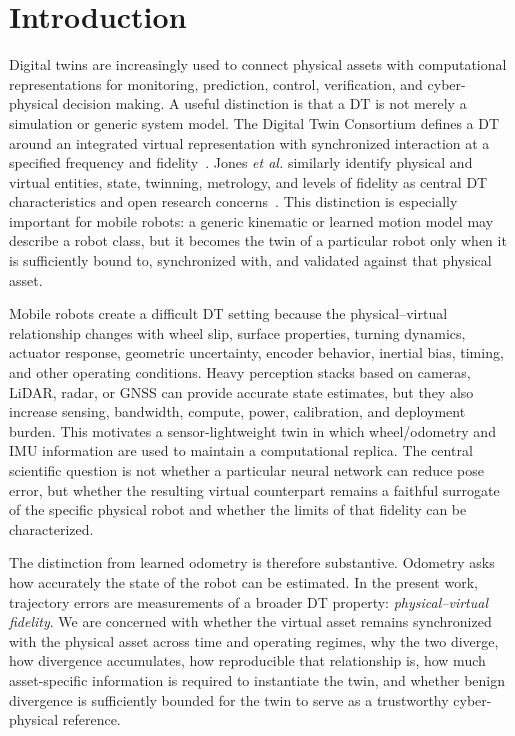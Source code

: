 \documentclass[conference]{IEEEtran}
\begin{document}
\section{Introduction}
Digital twins are increasingly used to connect physical assets with computational representations for monitoring, prediction, control, verification, and cyber-physical decision making. A useful distinction is that a DT is not merely a simulation or generic system model. The Digital Twin Consortium defines a DT around an integrated virtual representation with synchronized interaction at a specified frequency and fidelity~\cite{dtc_definition}. Jones \emph{et al.} similarly identify physical and virtual entities, state, twinning, metrology, and levels of fidelity as central DT characteristics and open research concerns~\cite{jones2020dt}. This distinction is especially important for mobile robots: a generic kinematic or learned motion model may describe a robot class, but it becomes the twin of a particular robot only when it is sufficiently bound to, synchronized with, and validated against that physical asset.

Mobile robots create a difficult DT setting because the physical--virtual relationship changes with wheel slip, surface properties, turning dynamics, actuator response, geometric uncertainty, encoder behavior, inertial bias, timing, and other operating conditions. Heavy perception stacks based on cameras, LiDAR, radar, or GNSS can provide accurate state estimates, but they also increase sensing, bandwidth, compute, power, calibration, and deployment burden. This motivates a sensor-lightweight twin in which wheel/odometry and IMU information are used to maintain a computational replica. The central scientific question is not whether a particular neural network can reduce pose error, but whether the resulting virtual counterpart remains a faithful surrogate of the specific physical robot and whether the limits of that fidelity can be characterized.

The distinction from learned odometry is therefore substantive. Odometry asks how accurately the state of the robot can be estimated. In the present work, trajectory errors are measurements of a broader DT property: \emph{physical--virtual fidelity}. We are concerned with whether the virtual asset remains synchronized with the physical asset across time and operating regimes, why the two diverge, how divergence accumulates, how reproducible that relationship is, how much asset-specific information is required to instantiate the twin, and whether benign divergence is sufficiently bounded for the twin to serve as a trustworthy cyber-physical reference.
\end{document}
